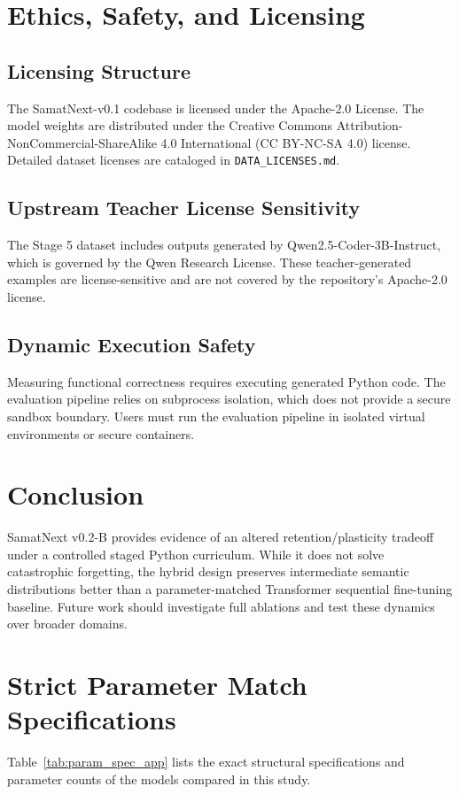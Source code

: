 \documentclass[11pt,a4paper]{article}
\begin{document}
\section{Ethics, Safety, and Licensing}
\subsection{Licensing Structure}
The SamatNext-v0.1 codebase is licensed under the Apache-2.0 License. The model weights are distributed under the Creative Commons Attribution-NonCommercial-ShareAlike 4.0 International (CC BY-NC-SA 4.0) license. Detailed dataset licenses are cataloged in \texttt{DATA\_LICENSES.md}.

\subsection{Upstream Teacher License Sensitivity}
The Stage 5 dataset includes outputs generated by Qwen2.5-Coder-3B-Instruct, which is governed by the Qwen Research License. These teacher-generated examples are license-sensitive and are not covered by the repository's Apache-2.0 license.

\subsection{Dynamic Execution Safety}
Measuring functional correctness requires executing generated Python code. The evaluation pipeline relies on subprocess isolation, which does not provide a secure sandbox boundary. Users must run the evaluation pipeline in isolated virtual environments or secure containers.

\section{Conclusion}
SamatNext v0.2-B provides evidence of an altered retention/plasticity tradeoff under a controlled staged Python curriculum. While it does not solve catastrophic forgetting, the hybrid design preserves intermediate semantic distributions better than a parameter-matched Transformer sequential fine-tuning baseline. Future work should investigate full ablations and test these dynamics over broader domains.




\appendix
\section{Strict Parameter Match Specifications}
Table~\ref{tab:param_spec_app} lists the exact structural specifications and parameter counts of the models compared in this study.
\end{document}
